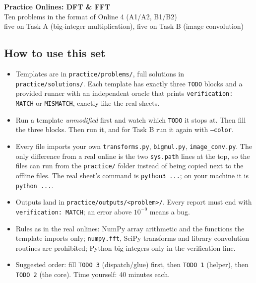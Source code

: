 \documentclass[11pt]{article}
\newcommand{\file}[1]{\texttt{#1}}
\newcommand{\code}[1]{\texttt{#1}}
\begin{document}
\begin{center}
  {\Large\bfseries Practice Onlines: DFT \& FFT}\\[4pt]
  {\large Ten problems in the format of Online 4 (A1/A2, B1/B2)}\\[2pt]
  five on Task A (big-integer multiplication), five on Task B (image convolution)
\end{center}

\subsection*{How to use this set}

\begin{itemize}[nosep]
  \item Templates are in \file{practice/problems/}, full solutions in
        \file{practice/solutions/}. Each template has exactly three \code{TODO}
        blocks and a provided runner with an independent oracle that prints
        \code{verification: MATCH} or \code{MISMATCH}, exactly like the real sheets.
  \item Run a template \emph{unmodified} first and watch which \code{TODO} it
        stops at. Then fill the three blocks. Then run it, and for Task B run it
        again with \code{--color}.
  \item Every file imports your own \file{transforms.py}, \file{bigmul.py},
        \file{image\_conv.py}. The only difference from a real online is the
        two \code{sys.path} lines at the top, so the files can run from the
        \file{practice/} folder instead of being copied next to the offline
        files. The real sheet's command is \code{python3 ...}; on your machine
        it is \code{python ...}.
  \item Outputs land in \file{practice/outputs/<problem>/}. Every report must
        end with \code{verification: MATCH}; an error above $10^{-9}$ means a bug.
  \item Rules as in the real onlines: NumPy array arithmetic and the functions
        the template imports only; \code{numpy.fft}, SciPy transforms and
        library convolution routines are prohibited; Python big integers only
        in the verification line.
  \item Suggested order: fill \code{TODO 3} (dispatch/glue) first, then
        \code{TODO 1} (helper), then \code{TODO 2} (the core). Time yourself:
        40 minutes each.
\end{itemize}
\end{document}
